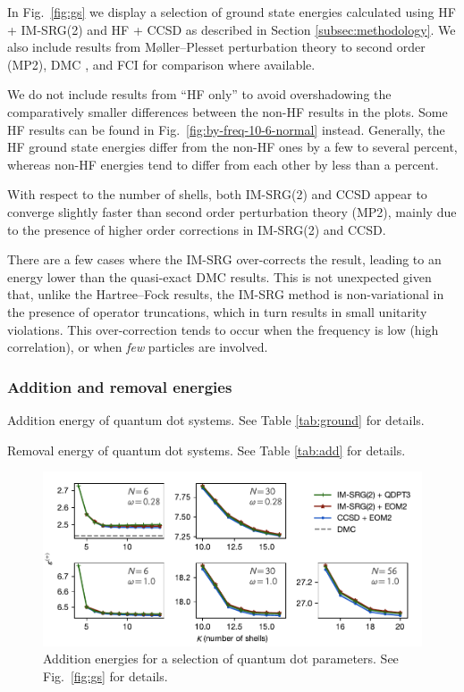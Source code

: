 In Fig.\ \ref{fig:gs} we display a selection of ground state energies calculated using HF + IM-SRG(2) and HF + CCSD as described in Section \ref{subsec:methodology}.  We also include results from M\o ller--Plesset perturbation theory to second order (MP2), DMC \cite{hoegberget2013thesis}, and FCI \cite{olsen2013thesis} for comparison where available.

We do not include results from ``HF only'' to avoid overshadowing the comparatively smaller differences between the non-HF results in the plots.  Some HF results can be found in Fig.\ \ref{fig:by-freq-10-6-normal} instead.  Generally, the HF ground state energies differ from the non-HF ones by a few to several percent, whereas non-HF energies tend to differ from each other by less than a percent.

With respect to the number of shells, both IM-SRG(2) and CCSD appear to converge slightly faster than second order perturbation theory (MP2), mainly due to the presence of higher order corrections in IM-SRG(2) and CCSD.

There are a few cases where the IM-SRG over-corrects the result, leading to an energy lower than the quasi-exact DMC results.  This is not unexpected given that, unlike the Hartree--Fock results, the IM-SRG method is non-variational in the presence of operator truncations, which in turn results in small unitarity violations.  This over-correction tends to occur when the frequency is low (high correlation), or when \emph{few} particles are involved.

\subsubsection{Addition and removal energies}

\begin{table}
  \centering
  \caption{Addition energy of quantum dot systems.  See Table \ref{tab:ground} for details.}
  \label{tab:add}
  
\end{table}

\begin{table}
  \centering
  \caption{Removal energy of quantum dot systems.  See Table \ref{tab:add} for details.}
  \label{tab:rm}
  
\end{table}

\begin{figure}
  \centering
  \includegraphics{fig-add2.pdf}
  \caption{Addition energies for a selection of quantum dot parameters.  See Fig.\ \ref{fig:gs} for details.}
  \label{fig:add}
\end{figure}

